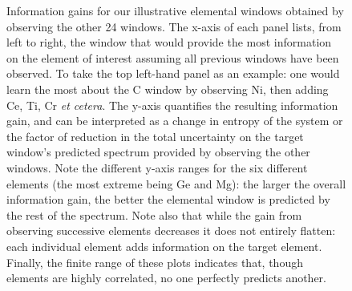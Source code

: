 \documentclass[a4paper,fleqn,usenatbib]{mnras}
\begin{document}
\begin{figure}
    \caption{Information gains for our illustrative elemental windows obtained by observing the other 24 windows. The x-axis of each panel lists, from left to right, the window that would provide the most information on the element of interest assuming all previous windows have been observed. To take the top left-hand panel as an example: one would learn the most about the C window by observing Ni, then adding Ce, Ti, Cr {\it et cetera}. The y-axis quantifies the resulting information gain, and can be interpreted as a change in entropy of the system or the factor of reduction in the total uncertainty on the target window's predicted spectrum provided by observing the other windows. Note the different y-axis ranges for the six different elements (the most extreme being Ge and Mg): the larger the overall information gain, the better the elemental window is predicted by the rest of the spectrum. Note also that while the gain from observing successive elements decreases it does not entirely flatten: each individual element adds information on the target element. Finally, the finite range of these plots indicates that, though elements are highly correlated, no one perfectly predicts another.}
    \label{fig:single_element_information}
\end{figure}
\end{document}
